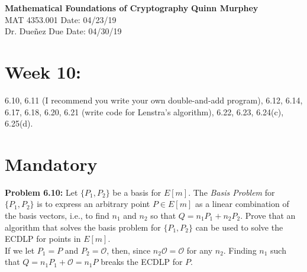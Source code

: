 \documentclass[a4paper, 11pt]{article}
\begin{document}
\noindent
\large\textbf{Mathematical Foundations of Cryptography} \hfill \textbf{Quinn Murphey} \\
\normalsize MAT 4353.001 \hfill Date: 04/23/19 \\
Dr. Dueñez \hfill Due Date: 04/30/19 \\
\noindent\makebox[\linewidth]{\rule{\paperwidth}{0.4pt}}
\section*{Week 10:}
    6.10, 6.11 (I recommend you write your own double-and-add program), 6.12, 6.14, 6.17, 6.18, 6.20, 6.21 (write code for Lenstra's algorithm), 6.22, 6.23, 6.24(c), 6.25(d).
    
\section*{Mandatory}

\noindent\textbf{Problem 6.10:}
    \singlespacing
    Let $\{P_1,P_2\}$ be a basis for $E[m]$. The \textit{Basis Problem} for $\{P_1,P_2\}$ is to express an arbitrary point $P\in E[m]$ as a linear combination of the basis vectors, i.e., to find $n_1$ and $n_2$ so that $Q=n_1P_1 + n_2P_2$. Prove that an algorithm that solves the basis problem for $\{P_1,P_2\}$ can be used to solve the ECDLP for points in $E[m]$.\\
    
    \doublespacing
    If we let $P_1=P$ and $P_2=\mathcal{O}$, then, since $n_2\mathcal{O}=\mathcal{O}$ for any $n_2$. Finding $n_1$ such that $Q=n_1P_1+\mathcal{O}=n_1P$ breaks the ECDLP for $P$.\\
    
\end{document}

